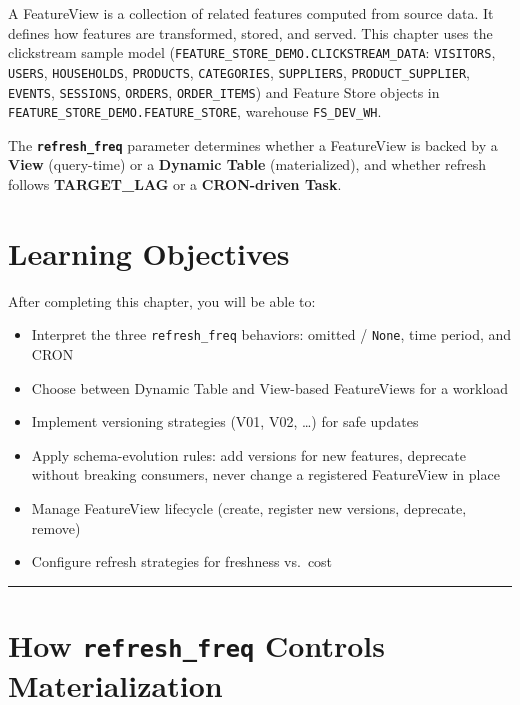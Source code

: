 \documentclass[
  letterpaper,
  DIV=11,
  numbers=noendperiod]{scrreprt}
\providecommand{\tightlist}{%
  \setlength{\itemsep}{0pt}\setlength{\parskip}{0pt}}\usepackage{longtable,booktabs,array}
\begin{document}
A FeatureView is a collection of related features computed from source
data. It defines how features are transformed, stored, and served. This
chapter uses the clickstream sample model
(\texttt{FEATURE\_STORE\_DEMO.CLICKSTREAM\_DATA}: \texttt{VISITORS},
\texttt{USERS}, \texttt{HOUSEHOLDS}, \texttt{PRODUCTS},
\texttt{CATEGORIES}, \texttt{SUPPLIERS}, \texttt{PRODUCT\_SUPPLIER},
\texttt{EVENTS}, \texttt{SESSIONS}, \texttt{ORDERS},
\texttt{ORDER\_ITEMS}) and Feature Store objects in
\texttt{FEATURE\_STORE\_DEMO.FEATURE\_STORE}, warehouse
\texttt{FS\_DEV\_WH}.

The \textbf{\texttt{refresh\_freq}} parameter determines whether a
FeatureView is backed by a \textbf{View} (query-time) or a
\textbf{Dynamic Table} (materialized), and whether refresh follows
\textbf{TARGET\_LAG} or a \textbf{CRON-driven Task}.

\hypertarget{learning-objectives-3}{%
\section{Learning Objectives}\label{learning-objectives-3}}

After completing this chapter, you will be able to:

\begin{itemize}
\tightlist
\item
  Interpret the three \texttt{refresh\_freq} behaviors: omitted /
  \texttt{None}, time period, and CRON
\item
  Choose between Dynamic Table and View-based FeatureViews for a
  workload
\item
  Implement versioning strategies (V01, V02, \ldots) for safe updates
\item
  Apply schema-evolution rules: add versions for new features, deprecate
  without breaking consumers, never change a registered FeatureView in
  place
\item
  Manage FeatureView lifecycle (create, register new versions,
  deprecate, remove)
\item
  Configure refresh strategies for freshness vs.~cost
\end{itemize}

\begin{center}\rule{0.5\linewidth}{0.5pt}\end{center}

\hypertarget{sec-refresh-freq-modes}{%
\section{\texorpdfstring{How \texttt{refresh\_freq} Controls
Materialization}{How refresh\_freq Controls Materialization}}\label{sec-refresh-freq-modes}}
\end{document}
